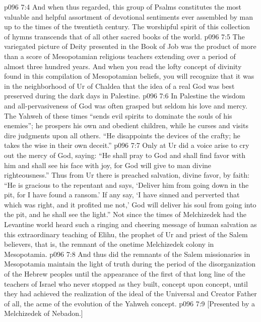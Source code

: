 \vs p096 7:4 And when thus regarded, this group of Psalms constitutes the most valuable and helpful assortment of devotional sentiments ever assembled by man up to the times of the twentieth century. The worshipful spirit of this collection of hymns transcends that of all other sacred books of the world.
\pc \vs p096 7:5 The variegated picture of Deity presented in the Book of Job was the product of more than a score of Mesopotamian religious teachers extending over a period of almost three hundred years. And when you read the lofty concept of divinity found in this compilation of Mesopotamian beliefs, you will recognize that it was in the neighborhood of Ur of Chaldea that the idea of a real God was best preserved during the dark days in Palestine.
\vs p096 7:6 In Palestine the wisdom and all\hyp{}pervasiveness of God was often grasped but seldom his love and mercy. The Yahweh of these times “sends evil spirits to dominate the souls of his enemies”; he prospers his own and obedient children, while he curses and visits dire judgments upon all others. “He disappoints the devices of the crafty; he takes the wise in their own deceit.”
\vs p096 7:7 Only at Ur did a voice arise to cry out the mercy of God, saying: “He shall pray to God and shall find favor with him and shall see his face with joy, for God will give to man divine righteousness.” Thus from Ur there is preached salvation, divine favor, by faith: “He is gracious to the repentant and says, ‘Deliver him from going down in the pit, for I have found a ransom.’ If any say, ‘I have sinned and perverted that which was right, and it profited me not,’ God will deliver his soul from going into the pit, and he shall see the light.” Not since the times of Melchizedek had the Levantine world heard such a ringing and cheering message of human salvation as this extraordinary teaching of Elihu, the prophet of Ur and priest of the Salem believers, that is, the remnant of the onetime Melchizedek colony in Mesopotamia.\plusone
\vs p096 7:8 And thus did the remnants of the Salem missionaries in Mesopotamia maintain the light of truth during the period of the disorganization of the Hebrew peoples until the appearance of the first of that long line of the teachers of Israel who never stopped as they built, concept upon concept, until they had achieved the realization of the ideal of the Universal and Creator Father of all, the acme of the evolution of the Yahweh concept.
\vsetoff
\vs p096 7:9 [Presented by a Melchizedek of Nebadon.]
